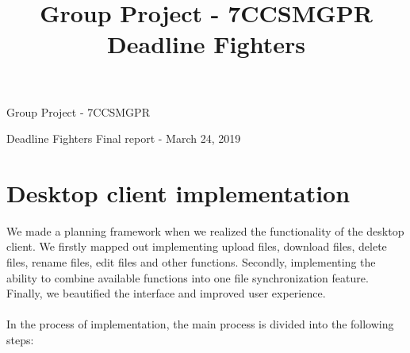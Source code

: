 \documentclass[a4paper]{article}
\title{Group Project - 7CCSMGPR \hspace{0.5 cm}Deadline Fighters}
\begin{document}
{
\begin{center}
		\LARGE{Group Project - 7CCSMGPR}
\end{center}
\begin{center}
		\hspace{0.5cm} Deadline Fighters \hspace{0.5 cm} Final report - March 24, 2019
\end{center}


\section{Desktop client implementation}
We made a planning framework when we realized the functionality of the desktop client. We firstly mapped out implementing upload files, download files, delete files, rename files, edit files and other functions. Secondly, implementing the ability to combine available functions into one file synchronization feature. Finally, we beautified the interface and improved user experience.\\\\
In the process of implementation, the main process is divided into the following steps:\\\\




}
\end{document}
